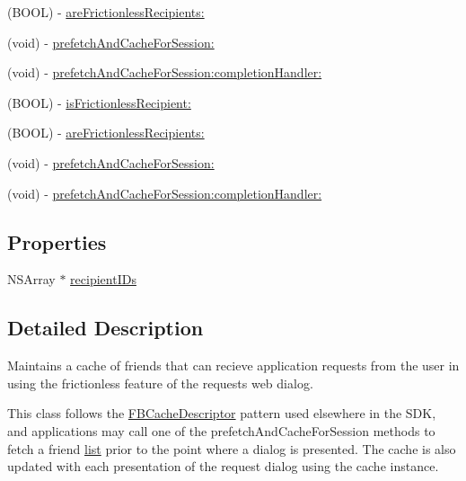 \begin{DoxyCompactItemize}
\item 
(B\+O\+OL) -\/ \hyperlink{interfaceFBFrictionlessRecipientCache_a8a6dcc263fb784a4a00fcd37a6a47ca6}{are\+Frictionless\+Recipients\+:}
\item 
(void) -\/ \hyperlink{interfaceFBFrictionlessRecipientCache_a4f218828f2b6a8bb5a8e0044e98689dc}{prefetch\+And\+Cache\+For\+Session\+:}
\item 
(void) -\/ \hyperlink{interfaceFBFrictionlessRecipientCache_a4c4c0f1fd519bfff5b39f3433fad29e3}{prefetch\+And\+Cache\+For\+Session\+:completion\+Handler\+:}
\item 
(B\+O\+OL) -\/ \hyperlink{interfaceFBFrictionlessRecipientCache_a9d03bd8dd9a235086cab18ab45b143cd}{is\+Frictionless\+Recipient\+:}
\item 
(B\+O\+OL) -\/ \hyperlink{interfaceFBFrictionlessRecipientCache_a8a6dcc263fb784a4a00fcd37a6a47ca6}{are\+Frictionless\+Recipients\+:}
\item 
(void) -\/ \hyperlink{interfaceFBFrictionlessRecipientCache_a4f218828f2b6a8bb5a8e0044e98689dc}{prefetch\+And\+Cache\+For\+Session\+:}
\item 
(void) -\/ \hyperlink{interfaceFBFrictionlessRecipientCache_a4c4c0f1fd519bfff5b39f3433fad29e3}{prefetch\+And\+Cache\+For\+Session\+:completion\+Handler\+:}
\end{DoxyCompactItemize}
\subsection*{Properties}
\begin{DoxyCompactItemize}
\item 
N\+S\+Array $\ast$ \hyperlink{interfaceFBFrictionlessRecipientCache_af68284081206dbe61081404081bbda4b}{recipient\+I\+Ds}
\end{DoxyCompactItemize}


\subsection{Detailed Description}
Maintains a cache of friends that can recieve application requests from the user in using the frictionless feature of the requests web dialog.

This class follows the {\ttfamily \hyperlink{interfaceFBCacheDescriptor}{F\+B\+Cache\+Descriptor}} pattern used elsewhere in the S\+DK, and applications may call one of the prefetch\+And\+Cache\+For\+Session methods to fetch a friend \hyperlink{protocollist-p}{list} prior to the point where a dialog is presented. The cache is also updated with each presentation of the request dialog using the cache instance. 


